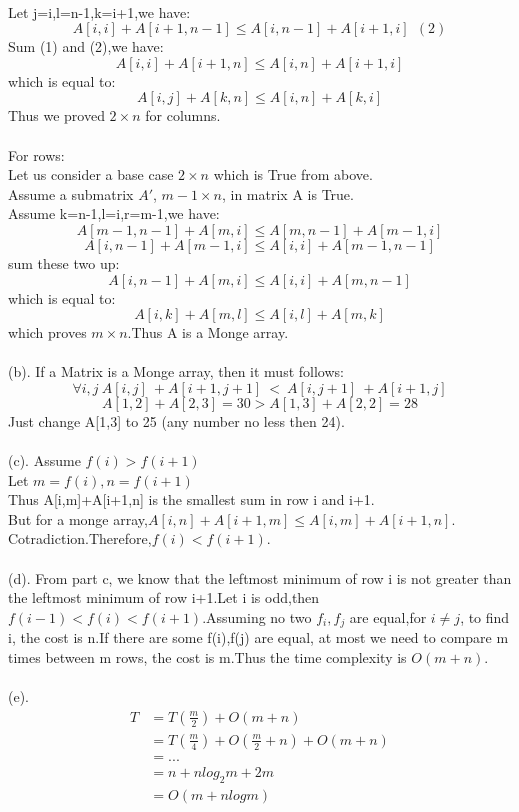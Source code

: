 \documentclass[11pt]{article}
\begin{document}
\\Let j=i,l=n-1,k=i+1,we have:
$$A[i,i]+A[i+1,n-1]\leq A[i,n-1]+A[i+1,i]\ \ (2)$$
Sum (1) and (2),we have:
$$A[i,i]+A[i+1,n]\leq A[i,n]+A[i+1,i]$$
which is equal to:
$$A[i,j]+A[k,n] \leq A[i,n]+A[k,i]$$
Thus we proved $2 \times n$ for columns.
\\
\\For rows:
\\Let us consider a base case $2 \times n$ which is True from above.
\\Assume a submatrix $A'$, $m-1 \times n$, in matrix A is True.
\\Assume k=n-1,l=i,r=m-1,we have:
$$A[m-1,n-1]+A[m,i]\leq A[m,n-1]+A[m-1,i]$$
$$A[i,n-1]+A[m-1,i]\leq A[i,i]+A[m-1,n-1]$$
sum these two up:
$$A[i,n-1]+A[m,i]\leq A[i,i]+A[m,n-1]$$
which is equal to:
$$A[i,k]+A[m,l]\leq A[i,l]+A[m,k]$$
which proves $m \times n$.Thus A is a Monge array.
\\
\\(b). If a Matrix is a Monge array, then it must follows:
$$\forall i,j\ A[i,j]\ +A[i+1,j+1]\ <\ A[i,j+1]\ +A[i+1,j]$$
$$A[1,2]+A[2,3]=30>A[1,3]+A[2,2]=28$$
Just change A[1,3] to 25 (any number no less then 24).
\\
\\(c). Assume $f(i)>f(i+1)$
\\Let $m=f(i),n=f(i+1)$
\\Thus A[i,m]+A[i+1,n] is the smallest sum in row i and i+1.
\\But for a monge array,$A[i,n]+A[i+1,m]\leq A[i,m]+A[i+1,n]$.
\\Cotradiction.Therefore,$f(i)<f(i+1)$.
\\
\\(d). From part c, we know that the leftmost minimum of row i is not greater than the leftmost minimum of row i+1.Let i is odd,then $f(i-1)<f(i)<f(i+1)$.Assuming no two $f_{i},f_{j}$ are equal,for $i\neq j$, to find i, the cost is n.If there are some f(i),f(j) are equal, at most we need to compare m times between m rows, the cost is m.Thus the time complexity is $O(m+n)$.
\\
\\(e).
\begin{align}
T&=T(\frac{m}{2})+O(m+n)\\
 &=T(\frac{m}{4})+O(\frac{m}{2}+n)+O(m+n)\\
 &=...\\
 &=n+nlog_{2}m+2m\\
 &=O(m+nlogm)
\end{align}
\\
\end{document}
